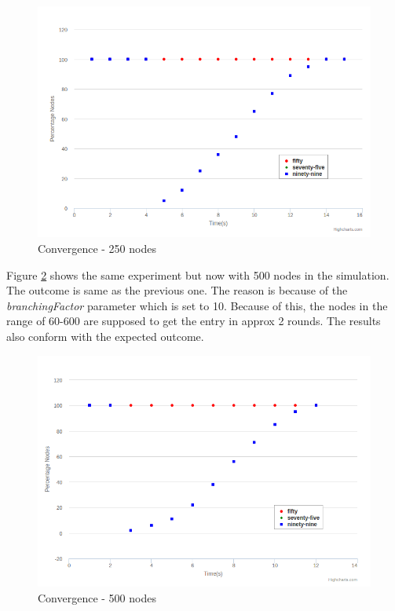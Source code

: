 \documentclass[12pt,a4paper,twoside,openright]{book}
\begin{document}
\begin{figure}[h]
	\includegraphics[scale=0.5]{250Convergence}
	\caption{Convergence - 250 nodes}
	\label{fig:250conv}
\end{figure}


Figure \ref{fig:500conv} shows the same experiment but now with 500 nodes in the simulation. The outcome is same as the previous one. The reason is because of the \textit{branchingFactor} parameter which is set to 10. Because of this, the nodes in the range of 60-600 are supposed to get the entry in approx 2 rounds. The results also conform with the expected outcome. 


\begin{figure}[h]
	\includegraphics[scale=0.5]{500Convergence}
	\caption{Convergence - 500 nodes}
	\label{fig:500conv}
\end{figure}
\end{document}
